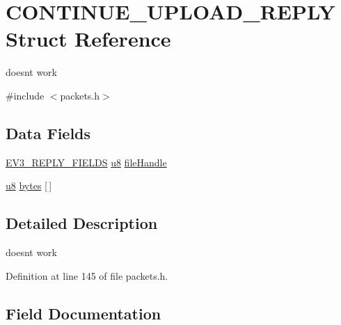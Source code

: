 \hypertarget{struct_c_o_n_t_i_n_u_e___u_p_l_o_a_d___r_e_p_l_y}{}\section{C\+O\+N\+T\+I\+N\+U\+E\+\_\+\+U\+P\+L\+O\+A\+D\+\_\+\+R\+E\+P\+L\+Y Struct Reference}
\label{struct_c_o_n_t_i_n_u_e___u_p_l_o_a_d___r_e_p_l_y}


doesn\textquotesingle{}t work  




{\ttfamily \#include $<$packets.\+h$>$}

\subsection*{Data Fields}
\begin{DoxyCompactItemize}
\item 
\hyperlink{packets_8h_a382c165d520d462ac8f0c88e2a1970cb}{E\+V3\+\_\+\+R\+E\+P\+L\+Y\+\_\+\+F\+I\+E\+L\+D\+S} \hyperlink{defs_8h_a92c50087ca0e64fa93fc59402c55f8ca}{u8} \hyperlink{struct_c_o_n_t_i_n_u_e___u_p_l_o_a_d___r_e_p_l_y_afdfd867e8243b0ae1e245e467179c567}{file\+Handle}
\item 
\hyperlink{defs_8h_a92c50087ca0e64fa93fc59402c55f8ca}{u8} \hyperlink{struct_c_o_n_t_i_n_u_e___u_p_l_o_a_d___r_e_p_l_y_a1fdde1580342b6b1df0d8f5213c45107}{bytes} \mbox{[}$\,$\mbox{]}
\end{DoxyCompactItemize}


\subsection{Detailed Description}
doesn\textquotesingle{}t work 

Definition at line 145 of file packets.\+h.



\subsection{Field Documentation}
\hypertarget{struct_c_o_n_t_i_n_u_e___u_p_l_o_a_d___r_e_p_l_y_a1fdde1580342b6b1df0d8f5213c45107}{}
